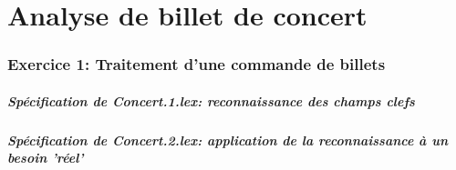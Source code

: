 \documentclass[./standalone.tex]{subfiles}
\begin{document}
\part{Analyse de billet de concert}

\section{Exercice 1: Traitement d'une commande de billets}


\subsubsection{Spécification de Concert.1.lex: reconnaissance des champs clefs}

\newpage

\subsubsection{Spécification de Concert.2.lex: application de la reconnaissance à un besoin 'réel'}






\end{document}
